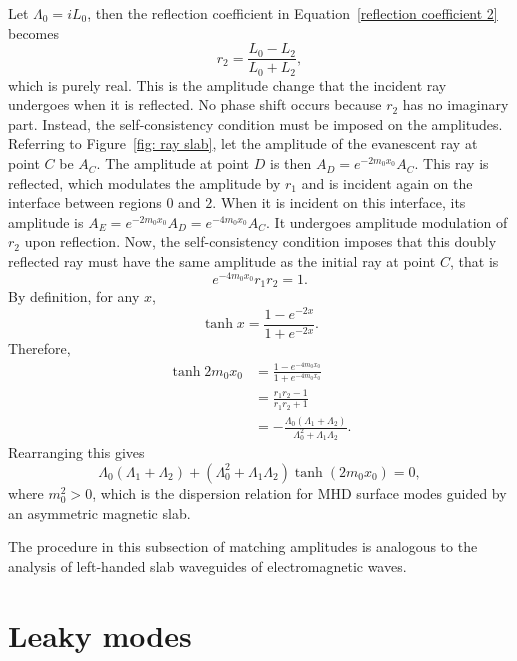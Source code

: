 \documentclass[12pt]{../style-files/ociamthesis}
\begin{document}
	Let $\Lambda_0 = iL_0$, then the reflection coefficient in Equation~\eqref{reflection coefficient 2} becomes
	\begin{equation}
	r_2 = \frac{L_0 - L_2}{L_0 + L_2},
	\end{equation}
	which is purely real. This is the amplitude change that the incident ray undergoes when it is reflected. No phase shift occurs because $r_2$ has no imaginary part. Instead, the self-consistency condition must be imposed on the amplitudes. Referring to Figure~\ref{fig: ray slab}, let the amplitude of the evanescent ray at point $C$ be $A_C$. The amplitude at point $D$ is then $A_D = e^{-2m_0x_0}A_C$. This ray is reflected, which modulates the amplitude by $r_1$ and is incident again on the interface between regions $0$ and $2$. When it is incident on this interface, its amplitude is $A_E = e^{-2m_0x_0}A_D = e^{-4m_0x_0}A_C$. It undergoes amplitude modulation of $r_2$ upon reflection. Now, the self-consistency condition imposes that this doubly reflected ray must have the same amplitude as the initial ray at point $C$, that is
	\begin{equation}
	e^{-4m_0x_0}r_1r_2 = 1.
	\end{equation}
	By definition, for any $x$,
	\begin{equation}
	\tanh{x} = \frac{1 - e^{-2x}}{1 + e^{-2x}}.
	\end{equation}
	Therefore,
	\begin{align}
	\tanh{2m_0x_0} &= \frac{1 - e^{-4m_0x_0}}{1 + e^{-4m_0x_0}} \\
	&= \frac{r_1r_2 - 1}{r_1r_2 + 1} \\
	&= -\frac{\Lambda_0(\Lambda_1 + \Lambda_2)}{\Lambda_0^2 + \Lambda_1\Lambda_2}.
	\end{align}
	Rearranging this gives
	\begin{equation}
	\Lambda_0 (\Lambda_1 + \Lambda_2) + (\Lambda_0^2 + \Lambda_1\Lambda_2)\tanh(2m_0x_0) = 0,
	\end{equation}
	where $m_0^2 > 0$, which is the dispersion relation for MHD surface modes guided by an asymmetric magnetic slab.
	
	The procedure in this subsection of matching amplitudes is analogous to the analysis of left-handed slab waveguides of electromagnetic waves.
	
	
	\section{Leaky modes}
	\label{sec: leaky}
	
\end{document}
